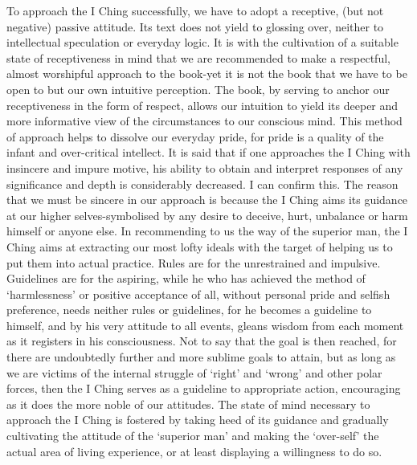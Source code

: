 \documentclass[11pt]{book}
\begin{document}
To approach the I Ching successfully, we have to adopt a receptive, (but not negative) passive attitude. Its text does not yield to glossing over, neither to intellectual speculation or everyday logic. It is with the cultivation of a suitable state of receptiveness in mind that we are recommended to make a respectful, almost worshipful approach to the book-yet it is not the book that we have to be open to but our own intuitive perception. The book, by serving to anchor our receptiveness in the form of respect, allows our intuition to yield its deeper and more informative view of the circumstances to our conscious mind. This method of approach helps to dissolve our everyday pride, for pride is a quality of the infant and over-critical intellect. It is said that if one approaches the I Ching with insincere and impure motive, his ability to obtain and interpret responses of any significance and depth is considerably decreased. I can confirm this. The reason that we must be sincere in our approach is because the I Ching aims its guidance at our higher selves-symbolised by any desire to deceive, hurt, unbalance or harm himself or anyone else. In recommending to us the way of the superior man, the I Ching aims at extracting our most lofty ideals with the target of helping us to put them into actual practice. Rules are for the unrestrained and impulsive. Guidelines are for the aspiring, while he who has achieved the method of `harmlessness' or positive acceptance of all, without personal pride and selfish preference, needs neither rules or guidelines, for he becomes a guideline to himself, and by his very attitude to all events, gleans wisdom from each moment as it registers in his consciousness. Not to say that the goal is then reached, for there are undoubtedly further and more sublime goals to attain, but as long as we are victims of the internal struggle of `right' and `wrong' and other polar forces, then the I Ching serves as a guideline to appropriate action, encouraging as it does the more noble of our attitudes. The state of mind necessary to approach the I Ching is fostered by taking heed of its guidance and gradually cultivating the attitude of the `superior man' and making the `over-self' the actual area of living experience, or at least displaying a willingness to do so.
\end{document}
